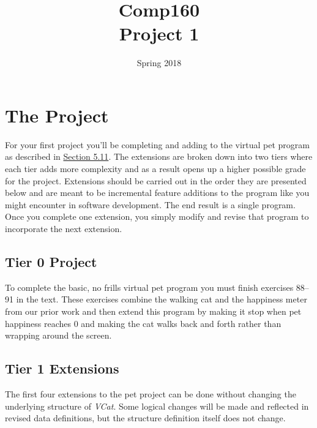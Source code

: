 \documentclass[nobib]{tufte-handout}
\title{Comp160 \\ Project 1 }
\author{}
\date{ Spring 2018 }
\begin{document}
\maketitle

\section*{The Project}

For your first project you'll be completing and adding to the virtual pet program as described in \href{http://htdp.org/2018-01-06/Book/part_one.html#%28part._sec~3azoo2%29}{Section 5.11}. The extensions are broken down into two tiers where each tier adds more complexity and as a result opens up a higher possible grade for the project. Extensions should be carried out in the order they are presented below and are meant to be incremental feature additions to the program like you might encounter in software development. The end result is a single program. Once you complete one extension, you simply modify and revise that program to incorporate the next extension.


\subsection*{Tier 0 Project}

To complete the basic, no frills virtual pet program you must finish exercises 88--91 in the text.  These exercises combine the walking cat and the happiness meter from our prior work and then extend this program by making it stop when pet happiness reaches 0 and making the cat walks back and forth rather than wrapping around the screen.

\subsection*{Tier 1 Extensions}

The first four extensions to the pet project can be done without changing the underlying structure of \textit{VCat}. Some logical changes will be made and reflected in revised data definitions, but the structure definition itself does not change.
\end{document}

